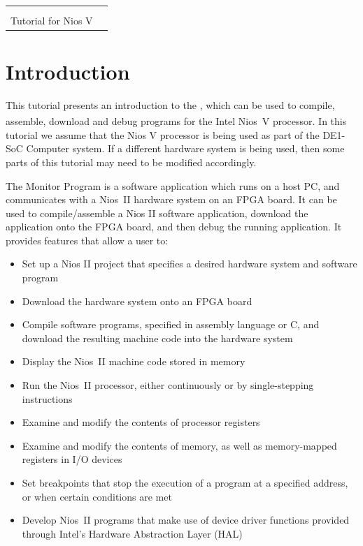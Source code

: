 \documentclass[11pt, twoside, pdftex]{article}
\title{\fontfamily{phv}\selectfont{\doctitle} }
\newcommand{\doctitle}{\productNameMed{} \\ Tutorial for Nios\textsuperscript{\textregistered} V}
\begin{document}
\begin{table}
    \centering
    \begin{tabular}{p{5cm}p{4cm}}
        \hspace{-3cm}
        &
        \raisebox{1\height}{\parbox[h]{0.5\textwidth}{\Large{}\selectfont{\textsf{\doctitle}}}}
    \end{tabular}
    \label{tab:logo}
\end{table}

\colorbox[rgb]{0,0.384,0.816}{\parbox[h]{\textwidth}{\color{white}\textsf{\textit{\textBar}}}}

\thispagestyle{plain}
 
\section{Introduction}

This tutorial presents an introduction to the \productNameMed{}, 
which can be used to compile, assemble, download and
debug programs for the Intel Nios\textsuperscript{\textregistered}~V processor. 
In this tutorial we assume that the Nios V processor is being used as part of the DE1-SoC
Computer system. If a different hardware system is being used, then some parts of this 
tutorial may need to be modified accordingly.

The Monitor Program is a software application which runs on a
host PC, and communicates with a Nios~II hardware system on an
FPGA board. It can be used to compile/assemble a
Nios II software application, download the application onto the
FPGA board, and then debug the running application.   
It provides features that allow a user to:

\begin{itemize}
    \item Set up a Nios II project that specifies a desired
hardware system and software program
    \item Download the hardware system onto an FPGA board
    \item Compile software programs, specified in assembly language or C, and download the resulting machine code into the
hardware system
    \item Display the Nios~II machine code stored in memory
    \item Run the Nios~II processor, either continuously or by single-stepping instructions
    \item Examine and modify the contents of processor registers
    \item Examine and modify the contents of memory, as well as
memory-mapped registers in I/O devices
    \item Set breakpoints that stop the execution of a program at
a specified address, or when certain conditions are met
    \item Develop Nios~II programs that make use of device driver
functions provided through Intel's Hardware Abstraction Layer
(HAL)
\end{itemize}
\end{document}
